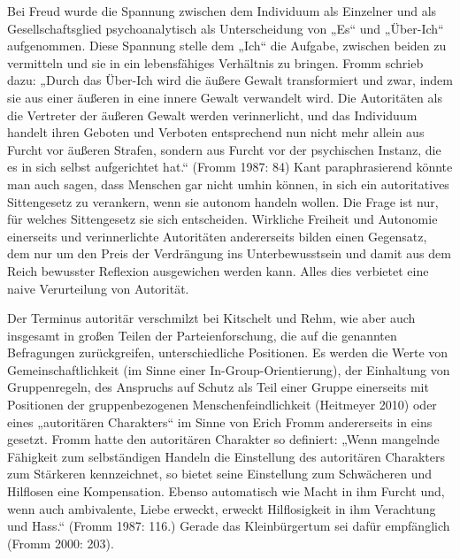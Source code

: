 \begin{multicols*}{2}
Bei Freud wurde die Spannung zwischen dem Individuum als Einzelner und als Gesellschaftsglied psychoanalytisch als Unterscheidung von „Es“ und „Über-Ich“ aufgenommen. Diese Spannung stelle dem „Ich“ die Aufgabe, zwischen beiden zu vermitteln und sie in ein lebensfähiges Verhältnis zu bringen. Fromm schrieb dazu: „Durch das Über-Ich wird die äußere Gewalt transformiert und zwar, indem sie aus einer äußeren in eine innere Gewalt verwandelt wird. Die Autoritäten als die Vertreter der äußeren Gewalt werden verinnerlicht, und das Individuum handelt ihren Geboten und Verboten entsprechend nun nicht mehr allein aus Furcht vor äußeren Strafen, sondern aus Furcht vor der psychischen Instanz, die es in sich selbst aufgerichtet hat.“ (Fromm 1987: 84) Kant paraphrasierend könnte man auch sagen, dass Menschen gar nicht umhin können, in sich ein autoritatives Sittengesetz zu verankern, wenn sie autonom handeln wollen. Die Frage ist nur, für welches Sittengesetz sie sich entscheiden. Wirkliche Freiheit und Autonomie einerseits und verinnerlichte Autoritäten andererseits bilden einen Gegensatz, dem nur um den Preis der Verdrängung ins Unterbewusstsein und damit aus dem Reich bewusster Reflexion ausgewichen werden kann. Alles dies verbietet eine naive Verurteilung von Autorität.

Der Terminus autoritär verschmilzt bei Kitschelt und Rehm, wie aber auch insgesamt in großen Teilen der Parteienforschung, die auf die genannten Befragungen zurückgreifen, unterschiedliche Positionen. Es werden die Werte von Gemeinschaftlichkeit (im Sinne einer In-Group-Orientierung), der Einhaltung von Gruppenregeln, des Anspruchs auf Schutz als Teil einer Gruppe einerseits mit Positionen der gruppenbezogenen Menschenfeindlichkeit (Heitmeyer 2010) oder eines „autoritären Charakters“ im Sinne von Erich Fromm andererseits in eins gesetzt. Fromm hatte den autoritären Charakter so definiert: „Wenn mangelnde Fähigkeit zum selbständigen Handeln die Einstellung des autoritären Charakters zum Stärkeren kennzeichnet, so bietet seine Einstellung zum Schwächeren und Hilflosen eine Kompensation. Ebenso automatisch wie Macht in ihm Furcht und, wenn auch ambivalente, Liebe erweckt, erweckt Hilflosigkeit in ihm Verachtung und Hass.“ (Fromm 1987: 116.) Gerade das Kleinbürgertum sei dafür empfänglich (Fromm 2000: 203). 


\end{multicols*}
